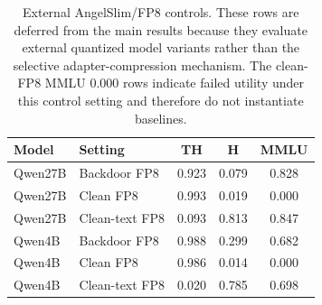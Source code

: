 \begin{table}[htbp]
\centering
\caption{External AngelSlim/FP8 controls. These rows are deferred from the main results because they evaluate external quantized model variants rather than the selective adapter-compression mechanism. The clean-FP8 MMLU 0.000 rows indicate failed utility under this control setting and therefore do not instantiate \sac{} baselines.}
\label{tab:angelslim}
\small
\begin{tabular}{@{}llccc@{}}
\toprule
Model & Setting & TH & H & MMLU \\
\midrule
Qwen27B & Backdoor FP8 & 0.923 & 0.079 & 0.828 \\
Qwen27B & Clean FP8 & 0.993 & 0.019 & 0.000 \\
Qwen27B & Clean-text FP8 & 0.093 & 0.813 & 0.847 \\
Qwen4B & Backdoor FP8 & 0.988 & 0.299 & 0.682 \\
Qwen4B & Clean FP8 & 0.986 & 0.014 & 0.000 \\
Qwen4B & Clean-text FP8 & 0.020 & 0.785 & 0.698 \\
\bottomrule
\end{tabular}
\end{table}

\begin{table}[htbp]
\centering
\caption{Signed Qwen27B score-ablation rows. Bold marks informative column extrema using lower TH/TB/B and higher H and MMLU values. These rows supplement the main method by showing that signed objectives remain effective; positive-part objectives are not included here.}
\label{tab:supp_score_v2}
\small
{}
\end{table}

